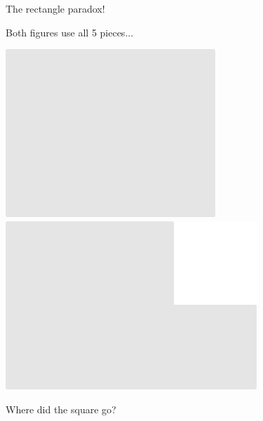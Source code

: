 \documentclass[14pt]{beamer}
\begin{document}
    \begin{frame}{The rectangle paradox!}
        \begin{center}
            Both figures use all 5 pieces...

            \vspace{36pt}

            \;\;\includegraphics[scale=0.5]{figures/figure022b.pdf}\qquad
            \qquad
            \includegraphics[scale=0.5]{figures/figure022e.pdf}

            \vspace{32pt}

            Where did the square go?
        \end{center}
    \end{frame}
\end{document}
